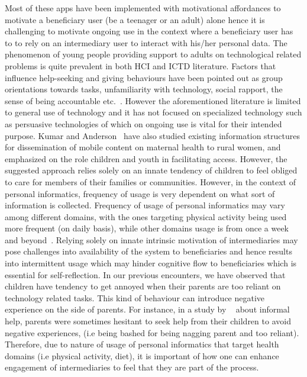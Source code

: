 \documentclass{sig-alternate}
\begin{document}
Most of these apps have been implemented with motivational affordances to motivate a beneficiary user (be a teenager or an adult) alone hence it is challenging to motivate ongoing use in the context where a beneficiary user has to to rely on an intermediary user to interact with his/her personal data. The phenomenon of young people providing support to adults on technological related problems is quite prevalent in both HCI and ICTD literature. Factors that influence help-seeking and giving behaviours have been pointed out as group orientations towards tasks, unfamiliarity with technology, social rapport, the sense of being accountable etc.~\cite{sambasivan2010,poole:chh,kiesler:twi,parikh2006}. However the aforementioned literature is limited to general use of technology and it has not focused on specialized technology such as persuasive technologies of which on ongoing use is vital for their intended purpose. Kumar and Anderson~\cite{kumar2015mobile} have also studied existing information structures for dissemination of mobile content on maternal health to rural women, and emphasized on the role children and youth in facilitating access. However, the suggested approach relies solely on an innate tendency of children to feel obliged to care for members of their families or communities. However, in the context of personal informatics, frequency of usage is very dependent on what sort of information is collected. Frequency of usage of personal informatics may vary among different domains, with the ones targeting physical activity being used more frequent (on daily basis), while other domains usage is from once a week and beyond~\cite{epstein2015lived}. Relying solely on innate intrinsic motivation of intermediaries may pose challenges into availability of the system to beneficiaries and hence results into intermittent usage which may hinder cognitive flow to beneficiaries which is essential for self-reflection. In our previous encounters, we have observed that children have tendency to get annoyed when their parents are too reliant on technology related tasks. This kind of behaviour can introduce negative experience on the side of parents. For instance, in a study by ~\cite{kiesler:twi} about informal help, parents were sometimes hesitant to seek help from their children to avoid negative experiences, (i.e being bashed for being nagging parent and too reliant). Therefore, due to nature of usage of personal informatics that target health domains (i.e physical activity, diet), it is important of how one can enhance engagement of intermediaries to feel that they are part of the process.
\end{document}

